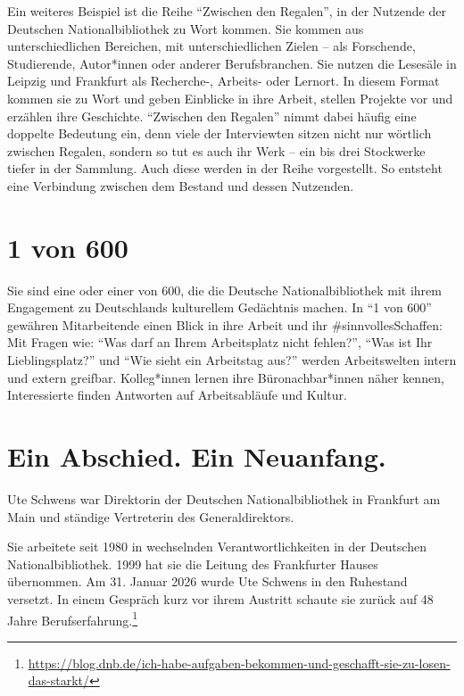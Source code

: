 \documentclass[a4paper,
fontsize=11pt,
oneside,
numbers=noperiodatend,
parskip=half-,
bibliography=totoc,
final
]{scrartcl}
\begin{document}
Ein weiteres Beispiel ist die Reihe \enquote{Zwischen den Regalen}, in
der Nutzende der Deutschen Nationalbibliothek zu Wort kommen. Sie kommen
aus unterschiedlichen Bereichen, mit unterschiedlichen Zielen -- als
Forschende, Studierende, Autor*innen oder anderer Berufsbranchen. Sie
nutzen die Lesesäle in Leipzig und Frankfurt als Recherche-, Arbeits-
oder Lernort. In diesem Format kommen sie zu Wort und geben Einblicke in
ihre Arbeit, stellen Projekte vor und erzählen ihre Geschichte.
\enquote{Zwischen den Regalen} nimmt dabei häufig eine doppelte
Bedeutung ein, denn viele der Interviewten sitzen nicht nur wörtlich
zwischen Regalen, sondern so tut es auch ihr Werk -- ein bis drei
Stockwerke tiefer in der Sammlung. Auch diese werden in der Reihe
vorgestellt. So entsteht eine Verbindung zwischen dem Bestand und dessen
Nutzenden.

\section{1 von 600}\label{von-600}

Sie sind eine oder einer von 600, die die Deutsche Nationalbibliothek
mit ihrem Engagement zu Deutschlands kulturellem Gedächtnis machen. In
\enquote{1 von 600} gewähren Mitarbeitende einen Blick in ihre Arbeit
und ihr \#sinnvollesSchaffen: Mit Fragen wie: \enquote{Was darf an Ihrem
Arbeitsplatz nicht fehlen?}, \enquote{Was ist Ihr Lieblingsplatz?} und
\enquote{Wie sieht ein Arbeitstag aus?} werden Arbeitswelten intern und
extern greifbar. Kolleg*innen lernen ihre Büronachbar*innen näher
kennen, Interessierte finden Antworten auf Arbeitsabläufe und Kultur.

\section{Ein Abschied. Ein
Neuanfang.}\label{ein-abschied.-ein-neuanfang.}

Ute Schwens war Direktorin der Deutschen Nationalbibliothek in Frankfurt
am Main und ständige Vertreterin des Generaldirektors.

Sie arbeitete seit 1980 in wechselnden Verantwortlichkeiten in der
Deutschen Nationalbibliothek. 1999 hat sie die Leitung des Frankfurter
Hauses übernommen. Am 31. Januar 2026 wurde Ute Schwens in den Ruhestand
versetzt. In einem Gespräch kurz vor ihrem Austritt schaute sie zurück
auf 48 Jahre Berufserfahrung.\footnote{\url{https://blog.dnb.de/ich-habe-aufgaben-bekommen-und-geschafft-sie-zu-losen-das-starkt/}}
\end{document}
